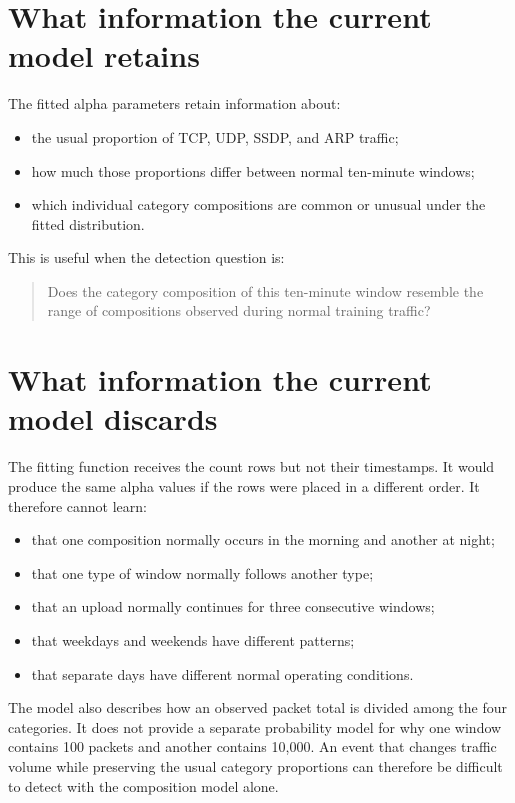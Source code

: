 \documentclass[11pt,a4paper]{article}
\begin{document}
\section{What information the current model retains}

The fitted alpha parameters retain information about:

\begin{itemize}
  \item the usual proportion of TCP, UDP, SSDP, and ARP traffic;
  \item how much those proportions differ between normal ten-minute windows;
  \item which individual category compositions are common or unusual under
        the fitted distribution.
\end{itemize}

This is useful when the detection question is:

\begin{quote}
Does the category composition of this ten-minute window resemble the range of
compositions observed during normal training traffic?
\end{quote}

\section{What information the current model discards}

The fitting function receives the count rows but not their timestamps.  It
would produce the same alpha values if the rows were placed in a different
order.  It therefore cannot learn:

\begin{itemize}
  \item that one composition normally occurs in the morning and another at
        night;
  \item that one type of window normally follows another type;
  \item that an upload normally continues for three consecutive windows;
  \item that weekdays and weekends have different patterns;
  \item that separate days have different normal operating conditions.
\end{itemize}

The model also describes how an observed packet total is divided among the
four categories.  It does not provide a separate probability model for why one
window contains 100 packets and another contains 10,000.  An event that changes
traffic volume while preserving the usual category proportions can therefore
be difficult to detect with the composition model alone.
\end{document}
